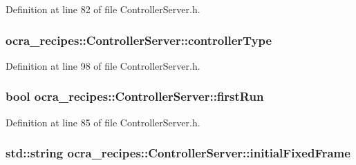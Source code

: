 Definition at line 82 of file Controller\+Server.\+h.

\subsubsection[{\texorpdfstring{controller\+Type}{controllerType}}]{ ocra\+\_\+recipes\+::\+Controller\+Server\+::controller\+Type\hspace{0.3cm}{\ttfamily [protected]}}\hypertarget{classocra__recipes_1_1ControllerServer_aaf53114a96960a3cb81577378c179411}{}\label{classocra__recipes_1_1ControllerServer_aaf53114a96960a3cb81577378c179411}


Definition at line 98 of file Controller\+Server.\+h.

\subsubsection[{\texorpdfstring{first\+Run}{firstRun}}]{\setlength{\rightskip}{0pt plus 5cm}bool ocra\+\_\+recipes\+::\+Controller\+Server\+::first\+Run\hspace{0.3cm}{\ttfamily [protected]}}\hypertarget{classocra__recipes_1_1ControllerServer_ad9aab75f01cb12f579ed441526b09ecf}{}\label{classocra__recipes_1_1ControllerServer_ad9aab75f01cb12f579ed441526b09ecf}


Definition at line 85 of file Controller\+Server.\+h.

\subsubsection[{\texorpdfstring{initial\+Fixed\+Frame}{initialFixedFrame}}]{\setlength{\rightskip}{0pt plus 5cm}std\+::string ocra\+\_\+recipes\+::\+Controller\+Server\+::initial\+Fixed\+Frame\hspace{0.3cm}{\ttfamily [protected]}}\hypertarget{classocra__recipes_1_1ControllerServer_a93ffe0eff924223989db0ae6fcafaca2}{}\label{classocra__recipes_1_1ControllerServer_a93ffe0eff924223989db0ae6fcafaca2}


